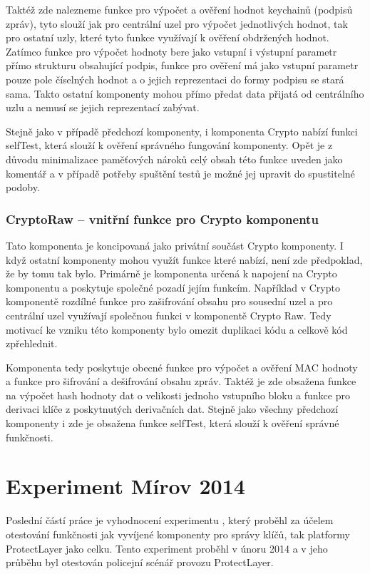 \documentclass[11pt,final,twoside]{fithesis2}
\begin{document}
Taktéž zde nalezneme funkce pro výpočet a ověření hodnot keychainů (podpisů zpráv), tyto slouží jak pro centrální uzel pro výpočet jednotlivých hodnot, tak pro ostatní uzly, které tyto funkce využívají k 
ověření obdržených hodnot. Zatímco funkce pro výpočet hodnoty bere jako vstupní i výstupní parametr přímo strukturu obsahující podpis, funkce pro ověření má jako vstupní parametr pouze pole číselných hodnot 
a o jejich reprezentaci do formy podpisu se stará sama. Takto ostatní komponenty mohou přímo předat data přijatá od centrálního uzlu a nemusí se jejich reprezentací zabývat.

Stejně jako v případě předchozí komponenty, i komponenta Crypto nabízí funkci selfTest, která slouží k ověření správného fungování komponenty. Opět je z důvodu minimalizace 
paměťových nároků celý obsah této funkce uveden jako komentář a v případě potřeby spuštění testů je možné jej upravit do spustitelné podoby.

\subsection{CryptoRaw -- vnitřní funkce pro Crypto komponentu} \label{sub:rawcrypto}

Tato komponenta je koncipovaná jako privátní součást Crypto komponenty. I když ostatní komponenty mohou využít funkce které 
nabízí, není zde předpoklad, že by tomu tak bylo. Primárně je komponenta určená k napojení na Crypto komponentu a poskytuje 
společné pozadí jejím funkcím. Například v Crypto komponentě rozdílné funkce pro zašifrování obsahu pro sousední uzel a pro 
centrální uzel využívají společnou funkci v komponentě Crypto Raw. Tedy motivací ke vzniku této komponenty bylo omezit duplikaci kódu 
a celkově kód zpřehlednit. 

Komponenta tedy poskytuje obecné funkce pro výpočet a ověření MAC hodnoty a funkce pro šifrování a dešifrování obsahu zpráv. 
Taktéž je zde obsažena funkce na výpočet hash hodnoty dat o velikosti jednoho vstupního bloku a funkce pro derivaci klíče z 
poskytnutých derivačních dat. Stejně jako všechny předchozí komponenty i zde je obsažena funkce selfTest, která slouží k ověření
správné funkčnosti. 

\chapter{Experiment Mírov 2014}
Poslední částí práce je vyhodnocení experimentu \cite{Svenda2014}, který proběhl za účelem otestování funkčnosti jak vyvíjené komponenty 
pro správy klíčů, tak platformy ProtectLayer jako celku. Tento experiment proběhl v únoru 2014 a v jeho průběhu byl otestován
policejní scénář provozu ProtectLayer. 
\end{document}
